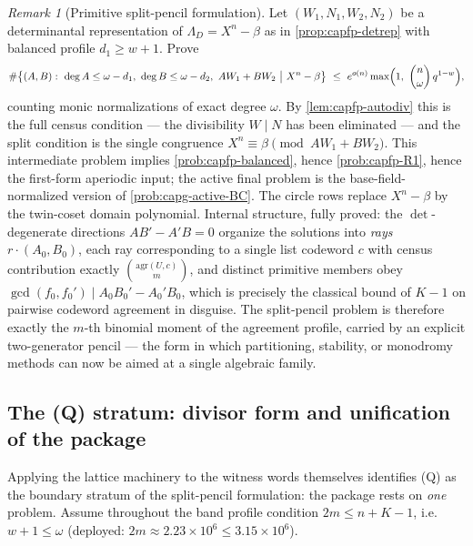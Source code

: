 \documentclass[11pt]{article}
\theoremstyle{definition}
\theoremstyle{remark}
\newtheorem{remark}[remark]{Remark}
\begin{document}
\begin{remark}[Primitive split-pencil formulation]\label{prob:capfp-split}
Let $(W_1,N_1,W_2,N_2)$ be a determinantal representation of $\Lambda_D=X^n-\beta$ as in \cref{prop:capfp-detrep} with balanced profile $d_1\ge w+1$.  Prove
\[
        \#\bigl\{(A,B):\ \deg A\le\omega-d_1,\ \deg B\le\omega-d_2,\ AW_1+BW_2\ \bigl|\ X^n-\beta\bigr\}
        \ \le\ e^{o(n)}\max\Bigl(1,\ \binom n\omega\,q^{1-w}\Bigr),
\]
counting monic normalizations of exact degree $\omega$.  By \cref{lem:capfp-autodiv} this is the full census condition --- the divisibility $W\mid N$ has been eliminated --- and the split condition is the single congruence $X^n\equiv\beta\pmod{AW_1+BW_2}$.  This intermediate problem implies \cref{prob:capfp-balanced}, hence \cref{prob:capfp-R1}, hence the first-form aperiodic input; the active final problem is the base-field-normalized version of \cref{prob:capg-active-BC}.  The circle rows replace $X^n-\beta$ by the twin-coset domain polynomial.  Internal structure, fully proved: the $\det$-degenerate directions $AB'-A'B=0$ organize the solutions into \emph{rays} $r\cdot(A_0,B_0)$, each ray corresponding to a single list codeword $c$ with census contribution exactly $\binom{\mathrm{agr}(U,c)}{m}$, and distinct primitive members obey $\gcd(f_0,f_0')\mid A_0B_0'-A_0'B_0$, which is precisely the classical bound of $K-1$ on pairwise codeword agreement in disguise.  The split-pencil problem is therefore exactly the $m$-th binomial moment of the agreement profile, carried by an explicit two-generator pencil --- the form in which partitioning, stability, or monodromy methods can now be aimed at a single algebraic family.
\end{remark}

\subsection{The \textup{(Q)} stratum: divisor form and unification of the package}

Applying the lattice machinery to the witness words themselves identifies \textup{(Q)} as the boundary stratum of the split-pencil formulation: the package rests on \emph{one} problem.  Assume throughout the band profile condition $2m\le n+K-1$, i.e.\ $w+1\le\omega$ \textup(deployed: $2m\approx2.23\times10^6\le3.15\times10^6$\textup).
\end{document}
